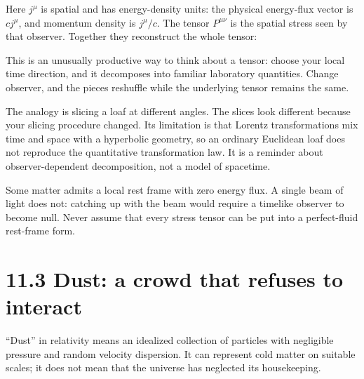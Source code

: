 \documentclass[
  11pt,
  letterpaper,
  oneside,
  openany]{scrbook}
\begin{document}
\begin{center}
\begingroup
{}
\ifdim\wd\grmathbox>\linewidth
\resizebox{\linewidth}{!}{\usebox{\grmathbox}}
\else\usebox{\grmathbox}\fi
\endgroup
\end{center}

Here \(j^\mu\) is spatial and has energy-density units: the physical
energy-flux vector is \(c j^\mu\), and momentum density is \(j^\mu/c\).
The tensor \(P^{\mu\nu}\) is the spatial stress seen by that observer.
Together they reconstruct the whole tensor:

\begin{center}
\begingroup
{}
\ifdim\wd\grmathbox>\linewidth
\resizebox{\linewidth}{!}{\usebox{\grmathbox}}
\else\usebox{\grmathbox}\fi
\endgroup
\end{center}

This is an unusually productive way to think about a tensor: choose your
local time direction, and it decomposes into familiar laboratory
quantities. Change observer, and the pieces reshuffle while the
underlying tensor remains the same.

The analogy is slicing a loaf at different angles. The slices look
different because your slicing procedure changed. Its limitation is that
Lorentz transformations mix time and space with a hyperbolic geometry,
so an ordinary Euclidean loaf does not reproduce the quantitative
transformation law. It is a reminder about observer-dependent
decomposition, not a model of spacetime.

Some matter admits a local rest frame with zero energy flux. A single
beam of light does not: catching up with the beam would require a
timelike observer to become null. Never assume that every stress tensor
can be put into a perfect-fluid rest-frame form.

\hypertarget{dust-a-crowd-that-refuses-to-interact}{%
\section{11.3 Dust: a crowd that refuses to
interact}\label{dust-a-crowd-that-refuses-to-interact}}

``Dust'' in relativity means an idealized collection of particles with
negligible pressure and random velocity dispersion. It can represent
cold matter on suitable scales; it does not mean that the universe has
neglected its housekeeping.
\end{document}
